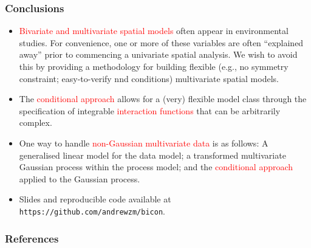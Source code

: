 \documentclass{beamer}
\begin{document}
\begin{frame}
\frametitle{Conclusions}
\vspace{-.8cm}
\begin{itemize}
\item \textcolor{red}{Bivariate and multivariate spatial models} often appear in environmental studies. For convenience, one or more of these variables are often ``explained away'' prior to commencing a univariate spatial analysis. We wish to avoid this by providing a methodology for building flexible (e.g., no symmetry constraint; easy-to-verify nnd conditions) multivariate spatial models.
\item The \textcolor{red}{conditional approach} allows for a (very) flexible model class through the specification of integrable \textcolor{red}{interaction functions} that can be arbitrarily complex.
\item One way to handle \textcolor{red}{non-Gaussian multivariate data} is as follows: A generalised linear model for the data model;  a transformed multivariate Gaussian process within the process model; and the \textcolor{red}{conditional approach} applied to the Gaussian process.
\item Slides and reproducible code available at \texttt{https://github.com/andrewzm/bicon}.
\end{itemize}
\end{frame}

\small

\begin{frame}[allowframebreaks]
\frametitle{References}


%
\vspace{-1cm}



\end{frame}
\end{document}
